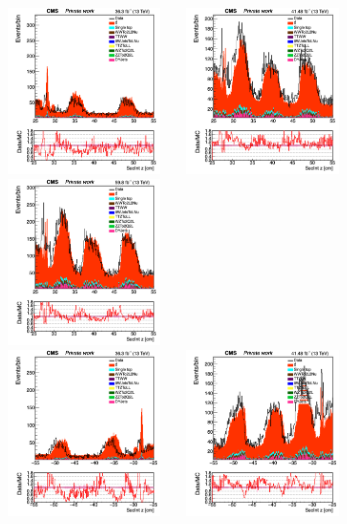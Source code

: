 \documentclass{cernatlasnote}
\begin{document}
\begin{figure}[htp]
\centering
\includegraphics[width=4.6cm, height=4.4cm]{images/emu_channel/2016/16_Plots_for_r_z/SecInt_z_Selec_eta_z_plus_25_55_Linear.png}
\includegraphics[width=4.6cm, height=4.4cm]{images/emu_channel/2017/17_Plots_for_r_z/SecInt_z_Selec_eta_plus_25_55_Linear.png}
 \includegraphics[width=4.6cm, height=4.4cm]{images/emu_channel/2018/18_Plots_for_r_z/SecInt_z_Selec_eta_z_25_55_Linear.png}\\
 \includegraphics[width=4.6cm, height=4.4cm]{images/emu_channel/2016/16_Plots_for_r_z/SecInt_z_Selec_eta_z_minus_25_55_Linear.png}
\includegraphics[width=4.6cm, height=4.4cm]{images/emu_channel/2017/17_Plots_for_r_z/SecInt_z_Selec_eta_minus_25_55_Linear.png}

\end{figure}
\end{document}
